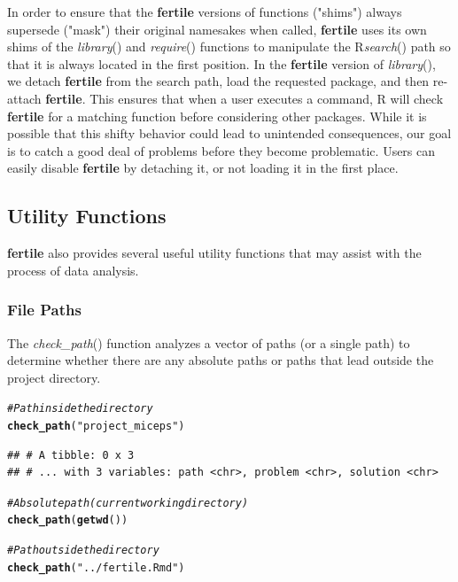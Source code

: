 \documentclass[APA,LATO1COL]{WileyNJD-v2}\usepackage[]{graphicx}\usepackage[]{color}
\makeatletter
\newcommand{\hlstr}[1]{\textcolor[rgb]{0.192,0.494,0.8}{#1}}%
\newcommand{\hlcom}[1]{\textcolor[rgb]{0.678,0.584,0.686}{\textit{#1}}}%
\newcommand{\hlstd}[1]{\textcolor[rgb]{0.345,0.345,0.345}{#1}}%
\newcommand{\hlkwd}[1]{\textcolor[rgb]{0.737,0.353,0.396}{\textbf{#1}}}%
\newenvironment{kframe}{%
 \def\at@end@of@kframe{}%
 \ifinner\ifhmode%
  \def\at@end@of@kframe{\end{minipage}}%
  \begin{minipage}{\columnwidth}%
 \fi\fi%
 \def\FrameCommand##1{\hskip\@totalleftmargin \hskip-\fboxsep
 \colorbox{shadecolor}{##1}\hskip-\fboxsep
     \hskip-\linewidth \hskip-\@totalleftmargin \hskip\columnwidth}%
 \MakeFramed {\advance\hsize-\width
   \@totalleftmargin\z@ \linewidth\hsize
   \@setminipage}}%
 {\par\unskip\endMakeFramed%
 \at@end@of@kframe}
\newenvironment{knitrout}{}{} %
\newcommand{\R}{\textsf{R}\xspace}
\newcommand{\pkg}[1]{\textbf{#1}}
\newcommand{\func}[1]{\textit{#1}()}
\makeatother
\begin{document}
In order to ensure that the \pkg{fertile} versions of functions ("shims") always supersede ("mask") their original namesakes when called, \pkg{fertile} uses its own shims of the \func{library} and \func{require} functions to  manipulate the \R \func{search} path so that it is always located in the first position. In the \pkg{fertile} version of \func{library}, we detach \pkg{fertile} from the search path, load the requested package, and then re-attach \pkg{fertile}. This ensures that when a user executes a command, \R will check \pkg{fertile} for a matching function before considering other packages. While it is possible that this shifty behavior could lead to unintended consequences, our goal is to catch a good deal of problems before they become problematic. Users can easily disable \pkg{fertile} by detaching it, or not loading it in the first place. 


\subsection{Utility Functions}

\pkg{fertile} also provides several useful utility functions that may assist with the process of data analysis. 

\subsubsection{File Paths}

The \func{check\_path} function analyzes a vector of paths (or a single path) to determine whether there are any absolute paths or paths that lead outside the project directory.

\begin{knitrout}
\color{fgcolor}\begin{kframe}
\begin{alltt}
\hlcom{# Path inside the directory}
\hlkwd{check_path}\hlstd{(}\hlstr{"project_miceps"}\hlstd{)}
\end{alltt}
\begin{verbatim}
## # A tibble: 0 x 3
## # ... with 3 variables: path <chr>, problem <chr>, solution <chr>
\end{verbatim}
\begin{alltt}
\hlcom{# Absolute path (current working directory)}
\hlkwd{check_path}\hlstd{(}\hlkwd{getwd}\hlstd{())}
\end{alltt}


{\ttfamily\noindent\bfseries\color{errorcolor}{\#\# Error: Detected absolute paths. Absolute paths are not reproducible and will likely only work on your computer.}}\begin{alltt}
\hlcom{# Path outside the directory}
\hlkwd{check_path}\hlstd{(}\hlstr{"../fertile.Rmd"}\hlstd{)}
\end{alltt}


{\ttfamily\noindent\bfseries\color{errorcolor}{\#\# Error: Detected paths that lead outside the project directory. Such paths are not reproducible and will likely only work on your computer.}}\end{kframe}
\end{knitrout}
\end{document}
